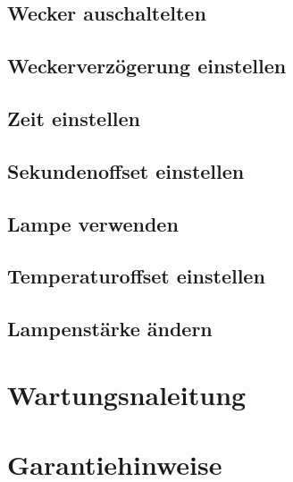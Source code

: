 \documentclass[12pt,a4paper,titlepage,headinclude]{scrartcl}
\numberwithin{equation}{subsection}
\begin{document}
\subsection{Wecker auschaltelten}


\subsection{Weckerverzögerung einstellen}


\subsection{Zeit einstellen}


\subsection{Sekundenoffset einstellen}


\subsection{Lampe verwenden}


\subsection{Temperaturoffset einstellen}


\subsection{Lampenstärke ändern}


\section{Wartungsnaleitung}
\label{sec:wartungsanleitung}

\section{Garantiehinweise}
\label{sec:Garantiehinweise}

\newpage
\printbibliography[heading=bibintoc]
\end{document}
